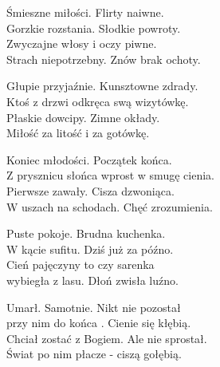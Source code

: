 \begin{text}
    Śmieszne miłości. Flirty naiwne.\\
    Gorzkie rozstania. Słodkie powroty.\\
    Zwyczajne włosy i oczy piwne.\\
    Strach niepotrzebny. Znów brak ochoty.

    Głupie przyjaźnie. Kunsztowne zdrady.\\
    Ktoś z drzwi odkręca swą wizytówkę.\\
    Płaskie dowcipy. Zimne okłady.\\
    Miłość za litość i za gotówkę.

    Koniec młodości. Początek końca.\\
    Z prysznicu słońca wprost w smugę cienia.\\
    Pierwsze zawały. Cisza dzwoniąca.\\
    W uszach na schodach. Chęć zrozumienia.

    Puste pokoje. Brudna kuchenka.\\
    W kącie sufitu. Dziś już za późno.\\
    Cień pajęczyny to czy sarenka\\
    wybiegła z lasu. Dłoń zwisła luźno.

    Umarł. Samotnie. Nikt nie pozostał\\
    przy nim do końca . Cienie się kłębią.\\
    Chciał zostać z Bogiem. Ale nie sprostał.\\
    Świat po nim płacze - ciszą gołębią.
\end{text}
\begin{chord}

\end{chord}